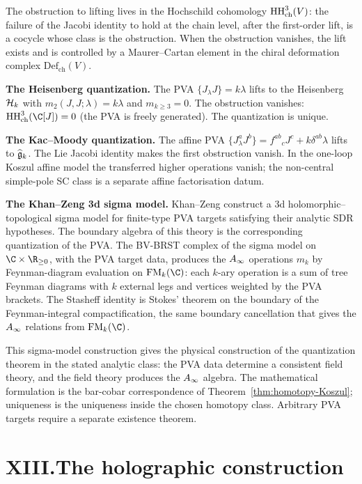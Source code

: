 The obstruction to lifting lives in the Hochschild cohomology
$\operatorname{HH}^3_{\mathrm{ch}}(V)$: the failure of the Jacobi identity
to hold at the chain level, after the first-order lift, is a
cocycle whose class is the obstruction. When the obstruction
vanishes, the lift exists and is controlled by a Maurer--Cartan
element in the chiral deformation complex
$\mathrm{Def}_{\mathrm{ch}}(V)$.

\medskip
\noindent\textbf{The Heisenberg quantization.}\enspace
The PVA $\{J_\lambda J\} = k\lambda$ lifts to the Heisenberg
$\mathcal{H}_k$ with $m_2(J,J;\lambda) = k\lambda$ and $m_{k \ge 3} = 0$.
The obstruction vanishes: $\HH^3_{\mathrm{ch}}(\C[J]) = 0$
(the PVA is freely generated). The quantization is unique.

\medskip
\noindent\textbf{The Kac--Moody quantization.}\enspace
The affine PVA $\{J^a_\lambda J^b\} = f^{ab}{}_c J^c +
k\delta^{ab}\lambda$ lifts to $\widehat{\mathfrak{g}}_k$. The
Lie Jacobi identity makes the first obstruction vanish.  In the
one-loop Koszul affine model the transferred higher operations vanish;
the non-central simple-pole SC class is a separate affine
factorisation datum.

\medskip
\noindent\textbf{The Khan--Zeng 3d sigma model.}\enspace
Khan--Zeng construct a 3d holomorphic--topological sigma model for
finite-type PVA targets satisfying their analytic SDR hypotheses. The
boundary algebra of this theory is the corresponding quantization of
the PVA\@. The BV-BRST complex of the sigma model
on $\C \times \R_{\ge 0}$, with the PVA target data,
produces the $A_\infty$ operations $m_k$ by Feynman-diagram evaluation
on $\FM_k(\C)$: each $k$-ary operation is a sum of tree Feynman
diagrams with $k$ external legs and vertices weighted by the PVA
brackets. The Stasheff identity is Stokes' theorem on the boundary
of the Feynman-integral compactification, the same boundary
cancellation that gives the $A_\infty$ relations from $\FM_k(\C)$.

This sigma-model construction gives the physical construction of the
quantization theorem in the stated analytic class: the PVA data
determine a consistent field theory, and the field theory produces
the $A_\infty$ algebra. The mathematical formulation is the bar-cobar
correspondence of Theorem~\ref{thm:homotopy-Koszul}; uniqueness is
the uniqueness inside the chosen homotopy class. Arbitrary
PVA targets require a separate existence theorem.


\section*{XIII.\quad The holographic construction}


